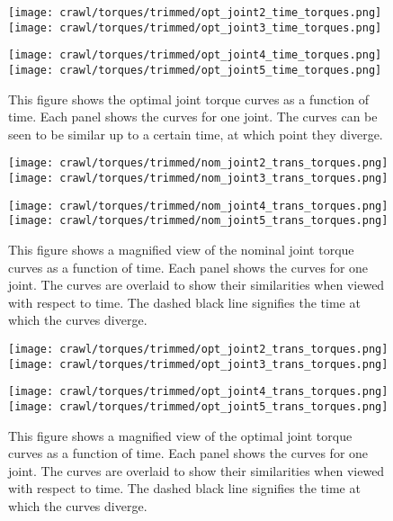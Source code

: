 \begin{figure}
  \centerline{
    \texttt{[image: crawl/torques/trimmed/opt\_joint2\_time\_torques.png]}
    \texttt{[image: crawl/torques/trimmed/opt\_joint3\_time\_torques.png]}
  }
  \centerline{
    \texttt{[image: crawl/torques/trimmed/opt\_joint4\_time\_torques.png]}
    \texttt{[image: crawl/torques/trimmed/opt\_joint5\_time\_torques.png]}
  }
  \caption{This figure shows the optimal joint torque curves as a function of time.
           Each panel shows the curves for one joint. The curves can be seen to be similar
           up to a certain time, at which point they diverge.}
  \label{fig:vrep_opt_joint_torques_by_joint_over_time1}
\end{figure}

\begin{figure}
  \centerline{
    \texttt{[image: crawl/torques/trimmed/nom\_joint2\_trans\_torques.png]}
    \texttt{[image: crawl/torques/trimmed/nom\_joint3\_trans\_torques.png]}
  }
  \centerline{
    \texttt{[image: crawl/torques/trimmed/nom\_joint4\_trans\_torques.png]}
    \texttt{[image: crawl/torques/trimmed/nom\_joint5\_trans\_torques.png]}
  }
  \caption{This figure shows a magnified view of the nominal joint torque curves as a function of time.
           Each panel shows the curves for one joint. The curves are overlaid to show their
           similarities when viewed with respect to time. The dashed black line signifies
           the time at which the curves diverge.}
  \label{fig:vrep_nom_joint_transient_torques_by_joint1}
\end{figure}

\begin{figure}
  \centerline{
    \texttt{[image: crawl/torques/trimmed/opt\_joint2\_trans\_torques.png]}
    \texttt{[image: crawl/torques/trimmed/opt\_joint3\_trans\_torques.png]}
  }
  \centerline{
    \texttt{[image: crawl/torques/trimmed/opt\_joint4\_trans\_torques.png]}
    \texttt{[image: crawl/torques/trimmed/opt\_joint5\_trans\_torques.png]}
  }
  \caption{This figure shows a magnified view of the optimal joint torque curves as a function of time.
           Each panel shows the curves for one joint. The curves are overlaid to show their
           similarities when viewed with respect to time. The dashed black line signifies
           the time at which the curves diverge.}
  \label{fig:vrep_opt_joint_transient_torques_by_joint1}
\end{figure}

